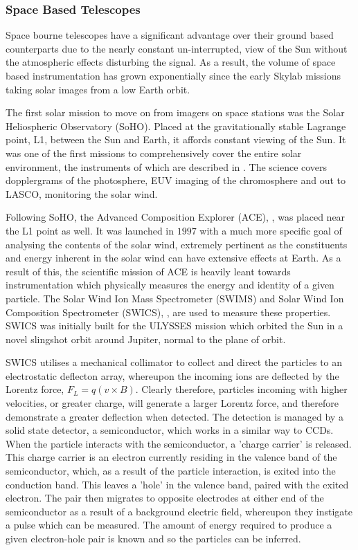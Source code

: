 \subsubsection{Space Based Telescopes}

Space bourne telescopes have a significant advantage over their ground based counterparts due to the nearly constant un-interrupted, view of the Sun without the atmospheric effects disturbing the signal.
As a result, the volume of space based instrumentation has grown exponentially since the early Skylab missions taking solar images from a low Earth orbit.

The first solar mission to move on from imagers on space stations was the Solar Heliospheric Observatory (SoHO).
Placed at the gravitationally stable Lagrange point, L1, between the Sun and Earth, it affords constant viewing of the Sun.
It was one of the first missions to comprehensively cover the entire solar environment, the instruments of which are described in \cite{StCyr}.
The science covers dopplergrams of the photosphere, EUV imaging of the chromosphere and out to LASCO, monitoring the solar wind.

Following SoHO, the Advanced Composition Explorer (ACE), \cite{Garrard1997}, was placed near the L1 point as well.
It was launched in $1997$ with a much more specific goal of analysing the contents of the solar wind, extremely pertinent as the constituents and energy inherent in the solar wind can have extensive effects at Earth.
As a result of this, the scientific mission of ACE is heavily leant towards instrumentation which physically measures the energy and identity of a given particle.
The Solar Wind Ion Mass Spectrometer (SWIMS) and Solar Wind Ion Composition Spectrometer (SWICS), \cite{Gloeckler1992}, are used to measure these properties.
SWICS was initially built for the ULYSSES \cite{Ulysses1992} mission which orbited the Sun in a novel slingshot orbit around Jupiter, normal to the plane of orbit.

SWICS utilises a mechanical collimator to collect and direct the particles to an electrostatic deflecton array, whereupon the incoming ions are deflected by the Lorentz force, $F_L = q(v \times B)$.
Clearly therefore, particles incoming with higher velocities, or greater charge, will generate a larger Lorentz force, and therefore demonstrate a greater deflection when detected.
The detection is managed by a solid state detector, a semiconductor, which works in a similar way to CCDs.
When the particle interacts with the semiconductor, a 'charge carrier' is released.
This charge carrier is an electron currently residing in the valence band of the semiconductor, which, as a result of the particle interaction, is exited into the conduction band.
This leaves a 'hole' in the valence band, paired with the exited electron. 
The pair then migrates to opposite electrodes at either end of the semiconductor as a result of a background electric field, whereupon they instigate a pulse which can be measured.
The amount of energy required to produce a given electron-hole pair is known and so the particles can be inferred.

